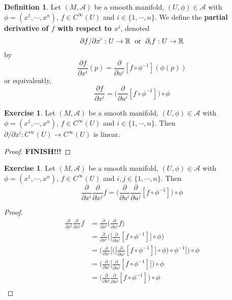 \documentclass{book}
\theoremstyle{definition}
\newtheorem{defn}[definition]{Definition}
\newtheorem{ex}[definition]{Exercise}
\newcommand{\R}{\mathbb{R}}
\newcommand{\MA}{\mathcal{A}}
\DeclareMathOperator*{\0}{\mbf{0}}
\DeclareMathOperator*{\1}{\mbf{1}}
\newcommand{\tbf}[1]{\textbf{#1}}
\newcommand{\p}{\partial}
\begin{document}
	\begin{defn}
	Let $(M, \MA)$ be a smooth manifold, $(U, \phi) \in \MA$ with $\phi = (x^1, \cdots, x^n)$, $f \in C^{\infty}(U)$ and $i \in \{1, \cdots, n\}$. We define the \tbf{partial derivative of $f$ with respect to $x^i$}, denoted $$ \p f / \p x^i: U \rightarrow \R \hspace{.1cm} \text{ or } \hspace{.1cm} \p_{i} f: U \rightarrow \R$$ by 
	\begin{equation*}
	\frac{\p f}{\p x^i}(p) = {\frac{\p}{\p u^i}[f \circ \phi^{-1}] }( \phi(p)) 
	\end{equation*}
	or equivalently,
	\begin{equation*}
	\frac{\p f}{\p x^i} = \bigg({\frac{\p}{\p u^i}[f \circ \phi^{-1}] \bigg) \circ \phi }
	\end{equation*}
	\end{defn}
	
	\begin{ex}
	Let $(M, \MA)$ be a smooth manifold, $(U, \phi) \in \MA$ with $\phi = (x^1, \cdots, x^n)$, $f \in C^{\infty}(U)$ and $i \in \{1, \cdots, n\}$. Then $\p / \p x^i:  C^{\infty}(U) \rightarrow C^{\infty}(U)$ is linear.
	\end{ex}
	
	\begin{proof}
	\tbf{FINISH!!!}
	\end{proof}
	
	\begin{ex}
	Let $(M, \MA)$ be a smooth manifold, $(U, \phi) \in \MA$ with $\phi = (x^1, \cdots, x^n)$, $f \in C^{\infty}(U)$ and $i,j \in \{1, \cdots, n\}$. Then 
	$$\frac{\p}{\p x^i}\frac{\p}{\p x^j} f =  \bigg(\frac{\p}{\p u^i} \frac{\p}{\p u^j}[f \circ \phi^{-1}] \bigg) \circ \phi $$
	\end{ex}
	
	\begin{proof}
	
	\begin{align*}
	\frac{\p}{\p x^i}\frac{\p}{\p x^j} f 
	&=\frac{\p}{\p x^i} \bigg(\frac{\p}{\p x^j} f \bigg) \\
	&=\frac{\p}{\p x^i} \bigg( \bigg[\frac{\p}{\p u^j} [f \circ \phi^{-1}] \bigg] \circ \phi \bigg) \\
	&=  \bigg( \frac{\p}{\p u^i} \bigg[ \bigg( \bigg[\frac{\p}{\p u^j} [f \circ \phi^{-1}] \bigg] \circ \phi \bigg) \circ \phi^{-1} \bigg] \bigg) \circ \phi \\
	&= \bigg( \frac{\p}{\p u^i} \bigg[\frac{\p}{\p u^j} [f \circ \phi^{-1}] \bigg]  \bigg) \circ \phi \\
	&= \bigg( \frac{\p}{\p u^i} \frac{\p}{\p u^j} [f \circ \phi^{-1}]  \bigg) \circ \phi \\
	\end{align*}
	\end{proof}
	
\end{document}
